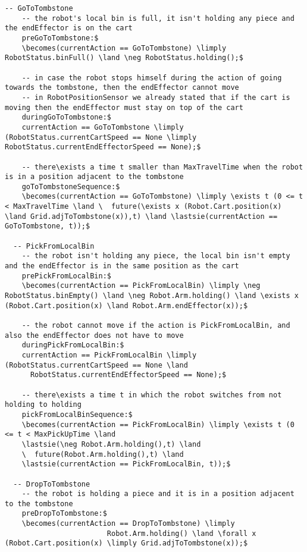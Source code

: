 \begin{lstlisting}[fontadjust, mathescape, frame=tlb]
  -- GoToTombstone
    -- the robot's local bin is full, it isn't holding any piece and the endEffector is on the cart
    preGoToTombstone:$
    \becomes(currentAction == GoToTombstone) \limply RobotStatus.binFull() \land \neg RobotStatus.holding();$
    
    -- in case the robot stops himself during the action of going towards the tombstone, then the endEffector cannot move
    -- in RobotPositionSensor we already stated that if the cart is moving then the endEffector must stay on top of the cart
    duringGoToTombstone:$
    currentAction == GoToTombstone \limply (RobotStatus.currentCartSpeed == None \limply RobotStatus.currentEndEffectorSpeed == None);$

    -- there\exists a time t smaller than MaxTravelTime when the robot is in a position adjacent to the tombstone
    goToTombstoneSequence:$
    \becomes(currentAction == GoToTombstone) \limply \exists t (0 <= t < MaxTravelTime \land \  future(\exists x (Robot.Cart.position(x) \land Grid.adjToTombstone(x)),t) \land \lastsie(currentAction == GoToTombstone, t));$

  -- PickFromLocalBin
    -- the robot isn't holding any piece, the local bin isn't empty and the endEffector is in the same position as the cart
    prePickFromLocalBin:$
    \becomes(currentAction == PickFromLocalBin) \limply \neg RobotStatus.binEmpty() \land \neg Robot.Arm.holding() \land \exists x (Robot.Cart.position(x) \land Robot.Arm.endEffector(x));$
    
    -- the robot cannot move if the action is PickFromLocalBin, and also the endEffector does not have to move
    duringPickFromLocalBin:$
    currentAction == PickFromLocalBin \limply (RobotStatus.currentCartSpeed == None \land
      RobotStatus.currentEndEffectorSpeed == None);$
  
    -- there\exists a time t in which the robot switches from not holding to holding
    pickFromLocalBinSequence:$
    \becomes(currentAction == PickFromLocalBin) \limply \exists t (0 <= t < MaxPickUpTime \land 
    \lastsie(\neg Robot.Arm.holding(),t) \land 
    \  future(Robot.Arm.holding(),t) \land 
    \lastsie(currentAction == PickFromLocalBin, t));$

  -- DropToTombstone
    -- the robot is holding a piece and it is in a position adjacent to the tombstone
    preDropToTombstone:$
    \becomes(currentAction == DropToTombstone) \limply
                        Robot.Arm.holding() \land \forall x (Robot.Cart.position(x) \limply Grid.adjToTombstone(x));$


\end{lstlisting}
